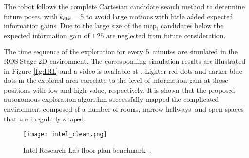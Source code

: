 The robot follows the complete Cartesian candidate search method to determine future poses, with $k_\text{dist}=5$ to avoid large motions with little added expected information gains. Due to the large size of the map, candidates below the expected information gain of $1.25$ are neglected from future consideration.

The time sequence of the exploration for every 5~minutes are simulated in the ROS Stage 2D environment. The corresponding simulation results are illustrated in Figure \ref{fig:IRL} and a video is available at \href{https://www.youtube.com/watch?v=5VdzKHreB_s}{}.
Lighter red dots and darker blue dots in the explored area correlate to the level of information gain at those positions with low and high value, respectively. It is shown that the proposed autonomous exploration algorithm successfully mapped the complicated environment composed of a number of rooms, narrow hallways, and open spaces that are irregularly shaped.


\begin{figure}
    \centering
    \texttt{[image: intel\_clean.png]}
    \caption{Intel Research Lab floor plan benchmark~\cite{kummerle2009measuring}.}
\label{fig:intel}
\end{figure}


